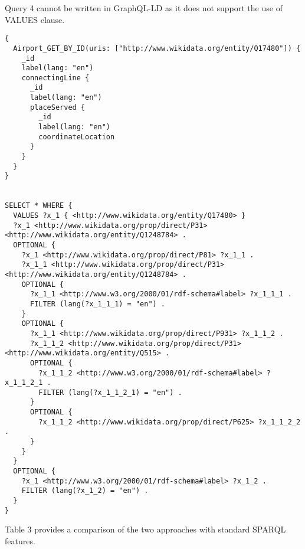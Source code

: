 Query 4 cannot be written in GraphQL-LD as it does not support the use of VALUES clause.

\begin{minipage}{\linewidth}
\begin{lstlisting}[label=listing:listing44, caption={Query 4 - HyperGraphQL}]
{
  Airport_GET_BY_ID(uris: ["http://www.wikidata.org/entity/Q17480"]) {
    _id
    label(lang: "en")
    connectingLine {
      _id
      label(lang: "en")
      placeServed {
        _id
        label(lang: "en")
        coordinateLocation
      }
    }
  }
} 


SELECT * WHERE {
  VALUES ?x_1 { <http://www.wikidata.org/entity/Q17480> }
  ?x_1 <http://www.wikidata.org/prop/direct/P31> <http://www.wikidata.org/entity/Q1248784> .
  OPTIONAL {
    ?x_1 <http://www.wikidata.org/prop/direct/P81> ?x_1_1 .
    ?x_1_1 <http://www.wikidata.org/prop/direct/P31> <http://www.wikidata.org/entity/Q1248784> .
    OPTIONAL {
      ?x_1_1 <http://www.w3.org/2000/01/rdf-schema#label> ?x_1_1_1 .
      FILTER (lang(?x_1_1_1) = "en") .
    }
    OPTIONAL {
      ?x_1_1 <http://www.wikidata.org/prop/direct/P931> ?x_1_1_2 .
      ?x_1_1_2 <http://www.wikidata.org/prop/direct/P31> <http://www.wikidata.org/entity/Q515> .
      OPTIONAL {
        ?x_1_1_2 <http://www.w3.org/2000/01/rdf-schema#label> ?x_1_1_2_1 .
        FILTER (lang(?x_1_1_2_1) = "en") .
      }
      OPTIONAL {
        ?x_1_1_2 <http://www.wikidata.org/prop/direct/P625> ?x_1_1_2_2 .
      }
    }
  }
  OPTIONAL {
    ?x_1 <http://www.w3.org/2000/01/rdf-schema#label> ?x_1_2 .
    FILTER (lang(?x_1_2) = "en") .
  }
}

\end{lstlisting}
\end{minipage}


Table 3 provides a comparison of the two approaches with standard SPARQL features.


